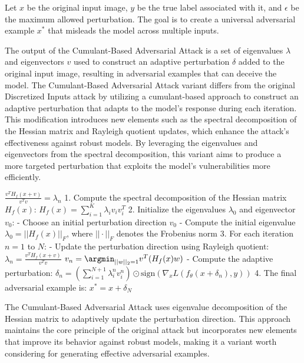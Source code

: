  Let $x$ be the original input image, $y$ be the true label associated with it, and $\epsilon$ be the maximum allowed perturbation. The goal is to create a universal adversarial example $x^*$ that misleads the model across multiple inputs.

The output of the Cumulant-Based Adversarial Attack is a set of eigenvalues $\lambda$ and eigenvectors $v$ used to construct an adaptive perturbation $\delta$ added to the original input image, resulting in adversarial examples that can deceive the model.
The Cumulant-Based Adversarial Attack variant differs from the original Discretized Inputs attack by utilizing a cumulant-based approach to construct an adaptive perturbation that adapts to the model's response during each iteration. This modification introduces new elements such as the spectral decomposition of the Hessian matrix and Rayleigh quotient updates, which enhance the attack's effectiveness against robust models. By leveraging the eigenvalues and eigenvectors from the spectral decomposition, this variant aims to produce a more targeted perturbation that exploits the model's vulnerabilities more efficiently.


$\frac{v^T H_f(x + v)}{v^T v} = \lambda_n$
1. Compute the spectral decomposition of the Hessian matrix $H_f(x)$:
   $H_f(x) = \sum_{i=1}^K \lambda_i v_i v_i^T$
2. Initialize the eigenvalues $\lambda_0$ and eigenvector $v_0$:
   - Choose an initial perturbation direction $v_0$
   - Compute the initial eigenvalue $\lambda_0 = ||H_f(x)||_{F}$, where $|| \cdot ||_{F}$ denotes the Frobenius norm
3. For each iteration $n = 1$ to $N$:
   - Update the perturbation direction using Rayleigh quotient:
     $\lambda_n = \frac{v^T H_f(x + v)}{v^T v}$
     $v_n = \argmin_{||w||_2=1} v^T (H_f(x) w)$
   - Compute the adaptive perturbation:
     $\delta_n = (\sum_{i=1}^{N+1} \lambda_i^n v_i^n) \odot \text{sign}(\nabla_x L(f_\theta(x + \delta_n), y))$
4. The final adversarial example is:
   $x^* = x + \delta_N$
   
The Cumulant-Based Adversarial Attack uses eigenvalue decomposition of the Hessian matrix to adaptively update the perturbation direction. This approach maintains the core principle of the original attack but incorporates new elements that improve its behavior against robust models, making it a variant worth considering for generating effective adversarial examples.